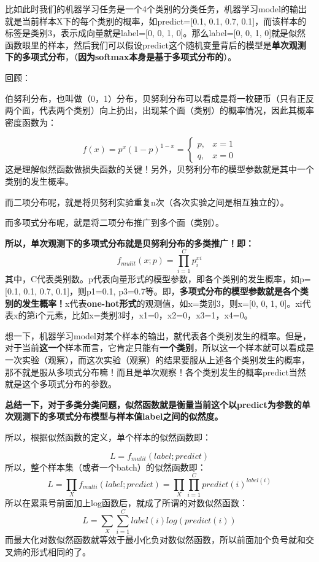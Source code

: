 比如此时我们的机器学习任务是一个4个类别的分类任务，机器学习model的输出就是当前样本X下的每个类别的概率，如predict={[}0.1,
0.1, 0.7, 0.1{]}，而该样本的标签是类别3，表示成向量就是label={[}0, 0, 1,
0{]}。那么label={[}0, 0, 1,
0{]}就是似然函数眼里的样本，然后我们可以假设predict这个随机变量背后的模型是\textbf{单次观测下的多项式分布}，（\textbf{因为softmax本身是基于多项式分布的}）。

回顾：

伯努利分布，也叫做（0，1）分布，贝努利分布可以看成是将一枚硬币（只有正反两个面，代表两个类别）向上扔出，出现某个面（类别）的概率情况，因此其概率密度函数为：

\[
f(x)=p^x(1-p)^{1-x}=
\begin{cases}
p,& x=1\\
q,& x=0
\end{cases}
\]
这是理解似然函数做损失函数的关键！另外，贝努利分布的模型参数就是其中一个类别的发生概率。

而二项分布呢，就是将贝努利实验重复n次（各次实验之间是相互独立的）。

而多项式分布呢，就是将二项分布推广到多个面（类别）。

\textbf{所以，单次观测下的多项式分布就是贝努利分布的多类推广！即：} \[
f_{mulit}(x;p)=\prod_{i=1}^C p_{i}^{xi}
\]
其中，C代表类别数。p代表向量形式的模型参数，即各个类别的发生概率，如p={[}0.1,
0.1, 0.7, 0.1{]}，则p1=0.1,
p3=0.7等。即，\textbf{多项式分布的模型参数就是各个类别的发生概率！}x代表\textbf{one-hot形式}的观测值，如x=类别3，则x={[}0,
0, 1, 0{]}。xi代表x的第i个元素，比如x=类别3时，x1=0，x2=0，x3=1，x4=0。

想一下，机器学习model对某个样本的输出，就代表各个类别发生的概率。但是，对于当前\textbf{这一个}样本而言，它肯定只能有\textbf{一个类别}，所以这一个样本就可以看成是一次实验（观察），而这次实验（观察）的结果要服从上述各个类别发生的概率，那不就是服从多项式分布嘛！而且是单次观察！各个类别发生的概率predict当然就是这个多项式分布的参数。

\textbf{总结一下，对于多类分类问题，似然函数就是衡量当前这个以predict为参数的单次观测下的多项式分布模型与样本值label之间的似然度。}

所以，根据似然函数的定义，单个样本的似然函数即：

\[
L = f_{mulit}(label;predict)
\] 所以，整个样本集（或者一个batch）的似然函数即： \[
L=\prod_{X}f_{multi}(label;predict)= \prod_{X}\prod_{i=1}^{C}predict(i)^{label(i)}
\] 所以在累乘号前面加上log函数后，就成了所谓的对数似然函数： \[
L=\sum_{X}\sum_{i=1}^{C}label(i)log(predict(i))
\]
而最大化对数似然函数就等效于最小化负对数似然函数，所以前面加个负号就和交叉熵的形式相同的了。

